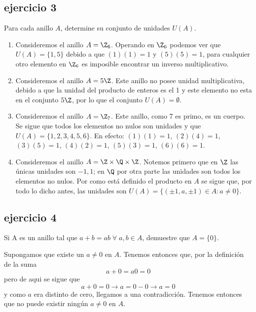 \subsection*{ejercicio 3}
	Para cada anillo $A$, determine su conjunto de unidades $U(A)$.
\begin{sol}
	\begin{enumerate}
	\item Consideremos el anillo $A= \Z_6$. Operando en $\Z_6$ podemos ver que $U(A)=\{1,5\}$ debido a que $(1)(1)=1$ y $(5)(5)=1$, para cualquier otro elemento en $\Z_6$ es imposible encontrar un inverso multiplicativo.
	
	\item Consideremos el anillo $A = 5\Z$. Este anillo no posee unidad multiplicativa, debido a que la unidad del producto de enteros es el 1 y este elemento no esta en el conjunto $5\Z$, por lo que el conjunto $U(A)=\emptyset$.
	
	\item Consideremos el anillo $A = \Z_7$. Este anillo, como 7 es primo, es un cuerpo. Se sigue que todos los elementos no nulos son unidades y que $U(A)=\{1,2,3,4,5,6\}$. En efecto: $(1)(1)=1$, $(2)(4)=1$, $(3)(5)=1$, $(4)(2)=1$, $(5)(3)=1$, $(6)(6)=1$.
	
	\item Consideremos el anillo $A = \Z \times \Q \times \Z$. Notemos primero que en $\Z$ las únicas unidades son $-1,1$; en $\Q$ por otra parte las unidades son todos los elementos no nulos. Por como está definido el producto en $A$ se sigue que, por todo lo dicho antes, las unidades son $U(A)=\{(\pm 1, a, \pm 1) \in  A : a \neq 0\}$.
	\end{enumerate}
\end{sol}
\subsection*{ejercicio 4}
	Si A es un anillo tal que $a+b = ab \; \forall \; a,b \in A$, demuestre que $A=\{0\}$.
\begin{sol}
	Supongamos que existe un $a \neq 0$ en $A$. Tenemos entonces que, por la definición de la suma
	$$a+0 = a0 = 0 $$
	pero de aqui se sigue que
	$$a + 0 = 0 \rightarrow a = 0-0 \rightarrow a=0$$
	y como $a$ era distinto de cero, llegamos a una contradicción. Tenemos entonces que no puede existir ningún $a \neq 0$ en $A$. 
\end{sol}

